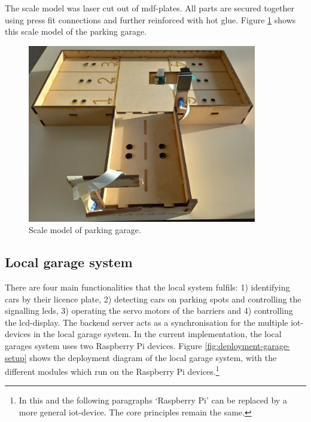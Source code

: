 \ind The scale model was laser cut out of \ac{mdf}-plates. All parts are secured together using press fit connections and further reinforced with hot glue. Figure \ref{fig:parking-garage} shows this scale model of the parking garage. 

\begin{figure}[H]
    \centering
    \includegraphics[width=10cm]{images/misc/parking_garage.jpg}
    \caption{Scale model of parking garage.}
    \label{fig:parking-garage}
\end{figure}

\subsection{Local garage system}\label{sec:implementation-on-site-system}
There are four main functionalities that the local system fulfils: 1) identifying cars by their licence plate, 2) detecting cars on parking spots and controlling the signalling \acp{led}, 3) operating the servo motors of the barriers and 4) controlling the \ac{lcd}-display. The backend server acts as a synchronisation for the multiple \ac{iot}-devices in the local garage system. In the current implementation, the local garages system uses two Raspberry Pi devices. Figure \ref{fig:deployment-garage-setup} shows the deployment diagram of the local garage system, with the different modules which run on the Raspberry Pi devices.\footnote{In this and the following paragraphs `Raspberry Pi' can be replaced by a more general \ac{iot}-device. The core principles remain the same.}

